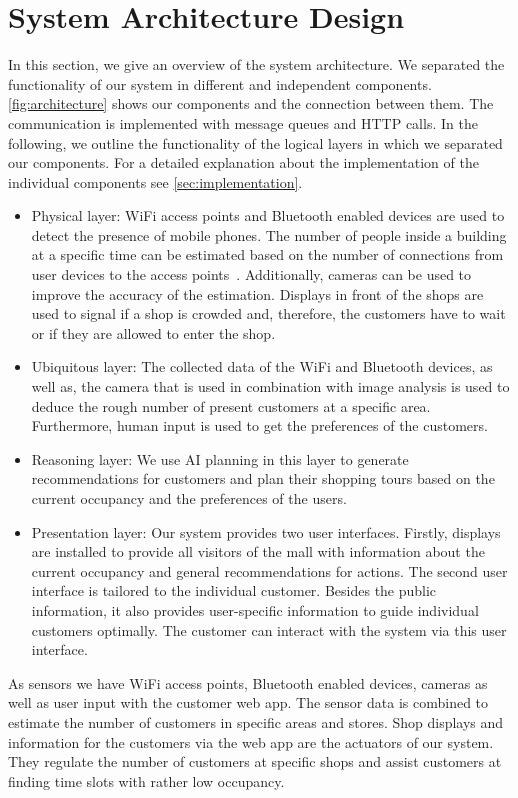 \documentclass[runningheads]{llncs}
\begin{document}
\section{System Architecture Design}\label{sec:architecture}
In this section, we give an overview of the system architecture. We separated the functionality of our system in different and independent components. \cref{fig:architecture} shows our components and the connection between them. The communication is implemented with message queues and HTTP calls. 
In the following, we outline the functionality of the logical layers in which we separated our components. For a detailed explanation about the implementation of the individual components see \cref{sec:implementation}.
\begin{itemize}
    \item Physical layer: WiFi access points and Bluetooth enabled devices are used to detect the presence of mobile phones. The number of people inside a building at a specific time can be estimated based on the number of connections from user devices to the access points~\cite{nguyenenabling}.
    Additionally, cameras can be used to improve the accuracy of the estimation. Displays in front of the shops are used to signal if a shop is crowded and, therefore, the customers have to wait or if they are allowed to enter the shop.
    \item Ubiquitous layer: The collected data of the WiFi and Bluetooth devices, as well as, the camera that is used in combination with image analysis is used to deduce the rough number of present customers at a specific area. Furthermore, human input is used to get the preferences of the customers. 
    \item Reasoning layer: We use AI planning in this layer to generate recommendations for customers and plan their shopping tours based on the current occupancy and the preferences of the users.
    \item Presentation layer: Our system provides two user interfaces. Firstly, displays are installed to provide all visitors of the mall with information about the current occupancy and general recommendations for actions. The second user interface is tailored to the individual customer. Besides the public information, it also provides user-specific information to guide individual customers optimally. The customer can interact with the system via this user interface.
\end{itemize}
As sensors we have WiFi access points, Bluetooth enabled devices, cameras as well as user input with the customer web app. The sensor data is combined to estimate the number of customers in specific areas and stores. Shop displays and information for the customers via the web app are the actuators of our system. They regulate the number of customers at specific shops and assist customers at finding time slots with rather low occupancy.
\end{document}
